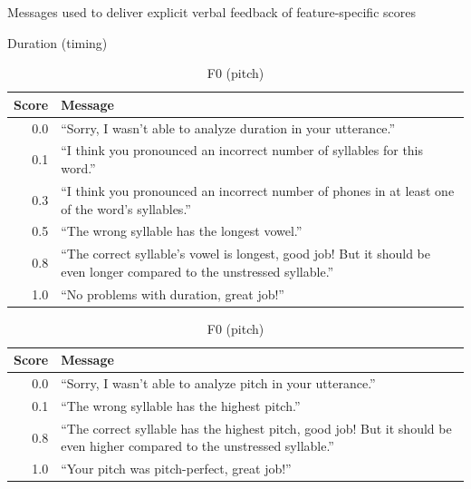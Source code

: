 		
		\begin{table}
			\centering
			\caption{Messages used to deliver explicit verbal feedback of feature-specific scores}
			
			\begin{subtable}{\textwidth}
				\centering
				\caption{Duration (timing)}
				\begin{tabularx}{\textwidth}{rX}
					\toprule
					Score & Message \\
					\midrule 
					 0.0 & ``Sorry, I wasn't able to analyze duration in your utterance.'' \\
					 0.1 & ``I think you pronounced an incorrect number of syllables for this word.'' \\
					0.3 & ``I think you pronounced an incorrect number of phones in at least one of the word's syllables.'' \\
					0.5 & ``The wrong syllable has the longest vowel.'' \\
					0.8 & ``The correct syllable's vowel is longest, good job! But it should be even longer compared to the unstressed syllable.'' \\
					1.0 & ``No problems with duration, great job!'' \\
		
					\bottomrule
				\end{tabularx}
				\label{tab:explicit:messages:dur}
			\end{subtable}	
			
			\vspace{1.5em}			
			
			\begin{subtable}{\textwidth}
				\centering
				\caption{F0 (pitch)}
				\begin{tabularx}{\textwidth}{rX}
					\toprule
					Score & Message \\
					\midrule 
					 0.0 & ``Sorry, I wasn't able to analyze pitch in your utterance.'' \\
					 0.1 & ``The wrong syllable has the highest pitch.'' \\
					0.8 & ``The correct syllable has the highest pitch, good job! But it should be even higher compared to the unstressed syllable.'' \\
					1.0 & ``Your pitch was pitch-perfect, great job!'' \\
					\bottomrule
				\end{tabularx}
				\label{tab:explicit:messages:f0}
			\end{subtable}	
			

\end{table}
